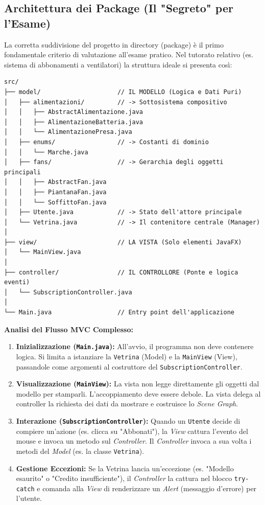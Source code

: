 \documentclass[12pt, a4paper]{article}
\begin{document}
\subsection{Architettura dei Package (Il "Segreto" per l'Esame)}
La corretta suddivisione del progetto in directory (package) è il primo fondamentale criterio di valutazione all'esame pratico. Nel tutorato relativo (es. sistema di abbonamenti a ventilatori) la struttura ideale si presenta così:

\begin{verbatim}
src/
├── model/                     // IL MODELLO (Logica e Dati Puri)
│   ├── alimentazioni/         // -> Sottosistema compositivo
│   │   ├── AbstractAlimentazione.java
│   │   ├── AlimentazioneBatteria.java
│   │   └── AlimentazionePresa.java
│   ├── enums/                 // -> Costanti di dominio
│   │   └── Marche.java
│   ├── fans/                  // -> Gerarchia degli oggetti principali
│   │   ├── AbstractFan.java
│   │   ├── PiantanaFan.java
│   │   └── SoffittoFan.java
│   ├── Utente.java            // -> Stato dell'attore principale
│   └── Vetrina.java           // -> Il contenitore centrale (Manager)
│
├── view/                      // LA VISTA (Solo elementi JavaFX)
│   └── MainView.java
│
├── controller/                // IL CONTROLLORE (Ponte e logica eventi)
│   └── SubscriptionController.java
│
└── Main.java                  // Entry point dell'applicazione
\end{verbatim}

\textbf{Analisi del Flusso MVC Complesso:}
\begin{enumerate}
    \item \textbf{Inizializzazione (\texttt{Main.java}):} All'avvio, il programma non deve contenere logica. Si limita a istanziare la \texttt{Vetrina} (Model) e la \texttt{MainView} (View), passandole come argomenti al costruttore del \texttt{SubscriptionController}.
    \item \textbf{Visualizzazione (\texttt{MainView}):} La vista non legge direttamente gli oggetti dal modello per stamparli. L'accoppiamento deve essere debole. La vista delega al controller la richiesta dei dati da mostrare e costruisce lo \textit{Scene Graph}.
    \item \textbf{Interazione (\texttt{SubscriptionController}):} Quando un \texttt{Utente} decide di compiere un'azione (es. clicca su "Abbonati"), la \textit{View} cattura l'evento del mouse e invoca un metodo sul \textit{Controller}. Il \textit{Controller} invoca a sua volta i metodi del \textit{Model} (es. la classe \texttt{Vetrina}).
    \item \textbf{Gestione Eccezioni:} Se la Vetrina lancia un'eccezione (es. "Modello esaurito" o "Credito insufficiente"), il \textit{Controller} la cattura nel blocco \texttt{try-catch} e comanda alla \textit{View} di renderizzare un \textit{Alert} (messaggio d'errore) per l'utente.
\end{enumerate}
\end{document}
